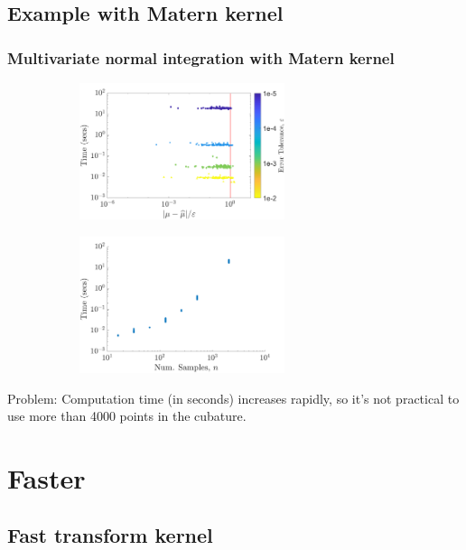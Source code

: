 \documentclass[10pt,compress,xcolor={usenames,dvipsnames}]{beamer} %
\begin{document}
\subsection{Example with Matern  kernel}
\begin{frame}
\frametitle{Multivariate normal integration with Matern kernel}
\begin{figure}[htp]
\captionsetup[subfigure]{labelformat=empty}
\centering
\begin{subfigure}[b]{0.49\textwidth}
\includegraphics[height=4cm]{MVN_guaranteed_time_Matern_d2_2018-Aug-31}
\end{subfigure}
\centering
\begin{subfigure}[b]{0.49\textwidth}
\includegraphics[height=4cm]{MVN_rapid_n_vs_time_Matern_d2_2018-Aug-31}
\end{subfigure}
\label{fig:MVN_Metern_d2b2}
\end{figure}
\alert{Problem}: Computation time (in seconds) increases rapidly, so it's not practical to use more than 4000 points in the cubature.
\end{frame}
















\section{Faster}



\subsection{Fast transform kernel}
\end{document}
